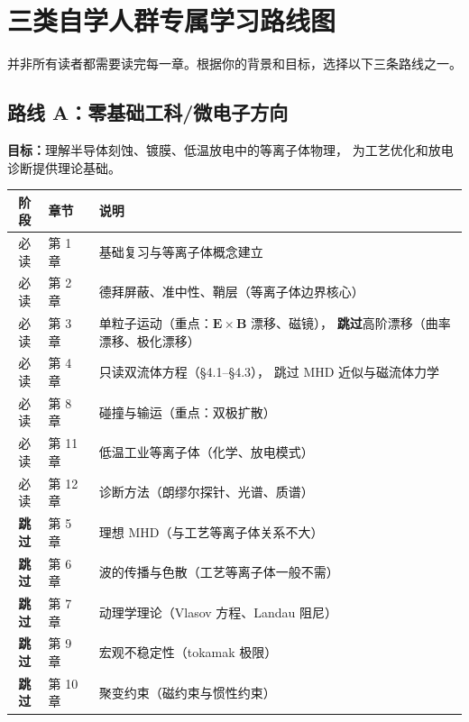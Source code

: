 \documentclass[12pt,a4paper,openany,oneside]{book}
\newcommand{\vect}[1]{\bm{#1}}
\begin{document}
\section*{三类自学人群专属学习路线图}

并非所有读者都需要读完每一章。根据你的背景和目标，选择以下三条路线之一。


\subsection*{路线 A：零基础工科/微电子方向}

\textbf{目标：}理解半导体刻蚀、镀膜、低温放电中的等离子体物理，
为工艺优化和放电诊断提供理论基础。

\begin{table}[htbp]
\centering
\begin{tabular}{@{}clp{6cm}@{}}
\toprule
\textbf{阶段} & \textbf{章节} & \textbf{说明} \\
\midrule
必读 & 第 1 章 & 基础复习与等离子体概念建立 \\
必读 & 第 2 章 & 德拜屏蔽、准中性、鞘层（等离子体边界核心） \\
必读 & 第 3 章 & 单粒子运动（重点：$\vect{E}\times\vect{B}$ 漂移、磁镜），
\textbf{跳过}高阶漂移（曲率漂移、极化漂移） \\
必读 & 第 4 章 & 只读双流体方程（\S 4.1--\S 4.3），
跳过 MHD 近似与磁流体力学 \\
必读 & 第 8 章 & 碰撞与输运（重点：双极扩散） \\
必读 & 第 11 章 & 低温工业等离子体（化学、放电模式） \\
必读 & 第 12 章 & 诊断方法（朗缪尔探针、光谱、质谱） \\
\midrule
\textbf{跳过} & 第 5 章 & 理想 MHD（与工艺等离子体关系不大） \\
\textbf{跳过} & 第 6 章 & 波的传播与色散（工艺等离子体一般不需） \\
\textbf{跳过} & 第 7 章 & 动理学理论（Vlasov 方程、Landau 阻尼） \\
\textbf{跳过} & 第 9 章 & 宏观不稳定性（tokamak 极限） \\
\textbf{跳过} & 第 10 章 & 聚变约束（磁约束与惯性约束） \\
\bottomrule
\end{tabular}
\end{table}
\end{document}
